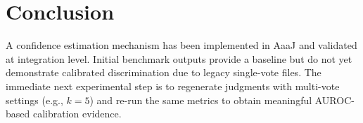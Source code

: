 \documentclass[11pt]{article}
\begin{document}
\section{Conclusion}
A confidence estimation mechanism has been implemented in AaaJ and validated at integration level. Initial benchmark outputs provide a baseline but do not yet demonstrate calibrated discrimination due to legacy single-vote files. The immediate next experimental step is to regenerate judgments with multi-vote settings (e.g., $k=5$) and re-run the same metrics to obtain meaningful AUROC-based calibration evidence.
\end{document}
